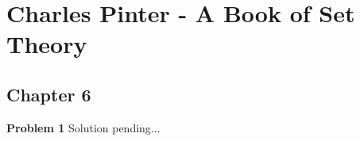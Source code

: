 \documentclass{article}
\begin{document}
\section*{Charles Pinter - A Book of Set Theory}
\subsection*{Chapter 6}

\textbf{Problem 1}
Solution pending...
\end{document}
